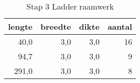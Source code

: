 \begin{table}[h!]
\centering
\caption{Stap 3 Ladder raamwerk}
\begin{tabular}{rrrr}
\toprule
 lengte &  breedte &  dikte &  aantal \\
\midrule
   40,0 &      3,0 &    3,0 &      16 \\
   94,7 &      3,0 &    3,0 &       9 \\
  291,0 &      3,0 &    3,0 &       8 \\
\bottomrule
\end{tabular}
\end{table}
